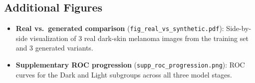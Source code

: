 \subsection{Additional Figures}

\begin{itemize}
    \item \textbf{Real vs.\ generated comparison} (\texttt{fig\_real\_vs\_synthetic.pdf}): Side-by-side visualization of 3 real dark-skin melanoma images from the training set and 3 generated variants.
    \item \textbf{Supplementary ROC progression} (\texttt{supp\_roc\_progression.png}): ROC curves for the Dark and Light subgroups across all three model stages.
\end{itemize}
